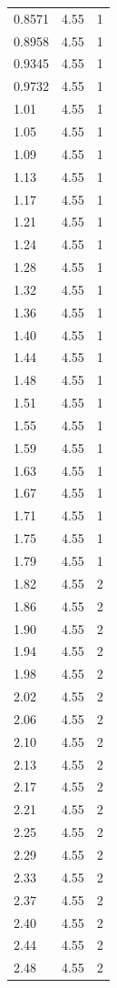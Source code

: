 \begin{longtable}{lrr}
  0.8571 & 4.55 & 1 \\
  0.8958 & 4.55 & 1 \\
  0.9345 & 4.55 & 1 \\
  0.9732 & 4.55 & 1 \\
  1.01 & 4.55 & 1 \\
  1.05 & 4.55 & 1 \\
  1.09 & 4.55 & 1 \\
  1.13 & 4.55 & 1 \\
  1.17 & 4.55 & 1 \\
  1.21 & 4.55 & 1 \\
  1.24 & 4.55 & 1 \\
  1.28 & 4.55 & 1 \\
  1.32 & 4.55 & 1 \\
  1.36 & 4.55 & 1 \\
  1.40 & 4.55 & 1 \\
  1.44 & 4.55 & 1 \\
  1.48 & 4.55 & 1 \\
  1.51 & 4.55 & 1 \\
  1.55 & 4.55 & 1 \\
  1.59 & 4.55 & 1 \\
  1.63 & 4.55 & 1 \\
  1.67 & 4.55 & 1 \\
  1.71 & 4.55 & 1 \\
  1.75 & 4.55 & 1 \\
  1.79 & 4.55 & 1 \\
  1.82 & 4.55 & 2 \\
  1.86 & 4.55 & 2 \\
  1.90 & 4.55 & 2 \\
  1.94 & 4.55 & 2 \\
  1.98 & 4.55 & 2 \\
  2.02 & 4.55 & 2 \\
  2.06 & 4.55 & 2 \\
  2.10 & 4.55 & 2 \\
  2.13 & 4.55 & 2 \\
  2.17 & 4.55 & 2 \\
  2.21 & 4.55 & 2 \\
  2.25 & 4.55 & 2 \\
  2.29 & 4.55 & 2 \\
  2.33 & 4.55 & 2 \\
  2.37 & 4.55 & 2 \\
  2.40 & 4.55 & 2 \\
  2.44 & 4.55 & 2 \\
  2.48 & 4.55 & 2 \\

\end{longtable}
